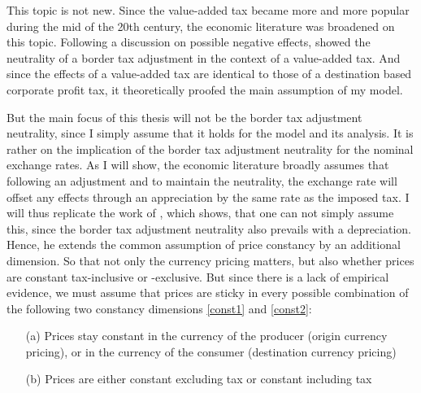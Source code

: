This topic is not new. Since the value-added tax became more and more popular during the mid of the 20th century, the economic literature was broadened on this topic. Following a discussion on possible negative effects, \cite{Feldstein&Krugman} showed the  neutrality of a border tax adjustment in the context of a value-added tax. And since the effects of a value-added tax are identical to those of a destination based corporate profit tax, it theoretically proofed the main assumption of my model. 

But the main focus of this thesis will not be the border tax adjustment neutrality, since I simply assume that it holds for the model and its analysis. It is rather on the implication of the border tax adjustment neutrality for the nominal exchange rates. As I will show, the economic literature broadly assumes that following an adjustment and to maintain the neutrality, the exchange rate will offset any effects through an appreciation by the same rate as the imposed tax. I will thus replicate the work of \cite{buiter2017exchange}, which shows, that one can not simply assume this, since the border tax adjustment neutrality also prevails with a depreciation. Hence, he extends the common assumption of price constancy by an additional dimension. So that not only the currency pricing matters, but also whether prices are constant tax-inclusive or -exclusive. But since there is a lack of empirical evidence, we must assume that prices are sticky in every possible combination of the following two constancy dimensions \ref{const1} and \ref{const2}:

\begin{itemize}
\item[(a)] \label{const1} Prices stay constant in the currency of the producer (origin currency pricing), or in the currency of the consumer (destination currency pricing)
\item[(b)] \label{const2} Prices are either constant excluding tax or constant including tax 
\end{itemize}\\

